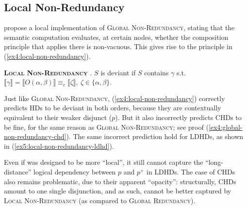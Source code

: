 \subsection{Local Non-Redundancy}
\textcite{Katzir2014} propose a local implementation of \textsc{Global Non-Redundancy}, stating that the semantic computation evaluates, at
certain nodes, whether the composition principle that applies there is non-vacuous. This gives rise to the principle in (\ref{ex4:local-non-redundancy}).

\begin{exe}
	 {\textsc{\textbf{Local Non-Redundancy}} \parencite{Katzir2014}. $S$ is deviant if $S$ contains $\gamma$ s.t. $\llbracket \gamma \rrbracket = \llbracket O(\alpha, \beta) \rrbracket \equiv_c \llbracket\zeta \rrbracket, \ \zeta \in \lbrace \alpha, \beta\rbrace$.}
\end{exe}

Just like \textsc{Global Non-Redundancy}, (\ref{ex4:local-non-redundancy}) correctly predicts HDs to be deviant in both orders, because they are contextually equivalent to their weaker disjunct ($p$). But it also incorrectly predicts CHDs to be fine, for the same reason as \textsc{Global Non-Redundancy}; see proof (\ref{ex4:global-non-redundancy-chd}). The same incorrect prediction hold for LDHDs, as shown in (\ref{ex5:local-non-redundancy-ldhd}).

\begin{exe}
	\label{ex5:local-non-redundancy-ldhd}
\end{exe}

Even if  was designed to be more ``local'',  it still cannot capture the ``long-distance'' logical dependency between $p$ and $p^+$ in LDHDs. The case of CHDs also remains problematic, due to their apparent ``opacity'': structurally, CHDs amount to one single disjunction, and as such, cannot be better captured by \textsc{Local Non-Redundancy} (as compared to \textsc{Global Redundancy}).


